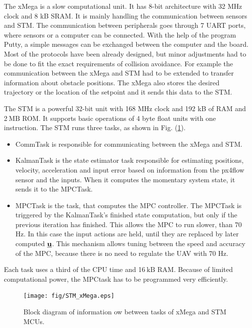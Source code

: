 \documentclass[a4paper,11pt,titlepage]{article}
\newcommand{\uvec}{\textbf{\underline{u}}}
\newcommand{\jed}[1]{\ensuremath{~\mathrm{#1}}}
\begin{document}
The xMega is a slow computational unit. It has 8-bit architecture with 32 MHz clock and 8 kB SRAM. It is mainly handling the communication between sensors and STM. The communication between peripherals goes through 7 UART ports, where sensors or a computer can be connected. With the help of the program Putty, a simple messages can be exchanged between the computer and the board. Most of the protocols have been already designed, but minor adjustments had to be done to fit the exact requirements of collision avoidance. For example the communication between the xMega and STM had to be extended to transfer information about obstacle positions. The xMega also stores the desired trajectory or the location of the setpoint and it sends this data to the STM. 

The STM is a powerful 32-bit unit with 168 MHz clock and 192 kB of RAM and 2\jed{MB} ROM. It supports basic operations of 4 byte float units with one instruction. The STM runs three tasks, as shown in Fig. (\ref{fig:feasibility_algorithm}).

\begin{itemize}
\item CommTask is responsible for communicating between the xMega and STM.

\item KalmanTask is the state estimator task responsible for estimating positions, velocity, acceleration and input error based on information from the px4flow sensor and the inputs. When it computes the momentary system state, it sends it to the MPCTask.

\item MPCTask is the task, that computes the MPC controller. The MPCTask is triggered by the KalmanTask's finished state computation, but only if the previous iteration has finished. This allows the MPC to run slower, than 70 Hz. In this case the input actions are held, until they are replaced by later computed $\uvec$. This mechanism allows tuning between the speed and accuracy of the MPC, because there is no need to regulate the UAV with 70 Hz.
\end{itemize}

Each task uses a third of the CPU time and 16\jed{kB} RAM. Because of limited computational power, the MPCtask has to be programmed very efficiently.

\begin{figure}[ht]
\centering
\texttt{[image: fig/STM\_xMega.eps]}
\caption{Block diagram of information 
ow between tasks of xMega and STM MCUs.}
\label{fig:feasibility_algorithm}
\end{figure}
\end{document}
